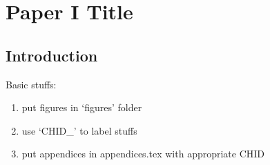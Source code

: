 \chapter{Paper I Title}\label{ch:\CHID}

	

\section{Introduction} \label{\CHID_sec:intro}
	Basic stuffs:
	\begin{enumerate}
		\item put figures in `figures' folder
		\item use `CHID\_' to label stuffs
		\item put appendices in appendices.tex with appropriate CHID
	\end{enumerate}